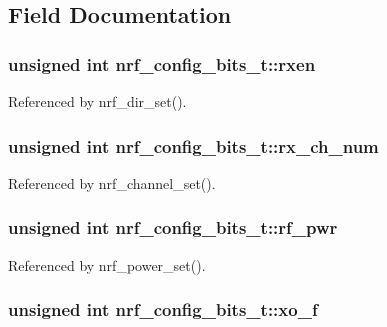 \subsection{Field Documentation}
\hypertarget{structnrf__config__bits__t_854c05fe9c8d602df4fbcb8f53669aca}{
\subsubsection{\setlength{\rightskip}{0pt plus 5cm}unsigned int {\bf nrf\_\-config\_\-bits\_\-t::rxen}}}
\label{structnrf__config__bits__t_854c05fe9c8d602df4fbcb8f53669aca}




Referenced by nrf\_\-dir\_\-set().\hypertarget{structnrf__config__bits__t_06ccf2e47df1431ffcad0c87946f59a7}{
\subsubsection{\setlength{\rightskip}{0pt plus 5cm}unsigned int {\bf nrf\_\-config\_\-bits\_\-t::rx\_\-ch\_\-num}}}
\label{structnrf__config__bits__t_06ccf2e47df1431ffcad0c87946f59a7}




Referenced by nrf\_\-channel\_\-set().\hypertarget{structnrf__config__bits__t_931af1233b52d2de3210af9a693d774a}{
\subsubsection{\setlength{\rightskip}{0pt plus 5cm}unsigned int {\bf nrf\_\-config\_\-bits\_\-t::rf\_\-pwr}}}
\label{structnrf__config__bits__t_931af1233b52d2de3210af9a693d774a}




Referenced by nrf\_\-power\_\-set().\hypertarget{structnrf__config__bits__t_6ab1a0df70813a03e2a8da882de23437}{
\subsubsection{\setlength{\rightskip}{0pt plus 5cm}unsigned int {\bf nrf\_\-config\_\-bits\_\-t::xo\_\-f}}}
\label{structnrf__config__bits__t_6ab1a0df70813a03e2a8da882de23437}




